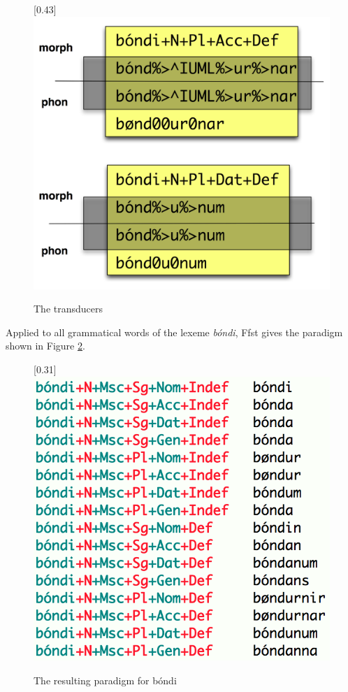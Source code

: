 \documentclass[11pt]{article}
\begin{document}
\begin{figure}[hp]
\begin{center}
\scalebox{0.43}[0.43]{\includegraphics{img/automaton.png}}
\caption{The transducers}
\label{automaton}
\end{center}
\end{figure}

Applied to all grammatical words of the lexeme \textit{bóndi}, Ffst gives the paradigm shown in Figure \ref{bondiparadigm}.

\begin{figure}[hp]
\begin{center}
\scalebox{0.31}[0.31]{\includegraphics{img/bondiparadigm.png}} 
\caption{The resulting paradigm for bóndi}
\label{bondiparadigm}
\end{center}
\end{figure}
\end{document}
